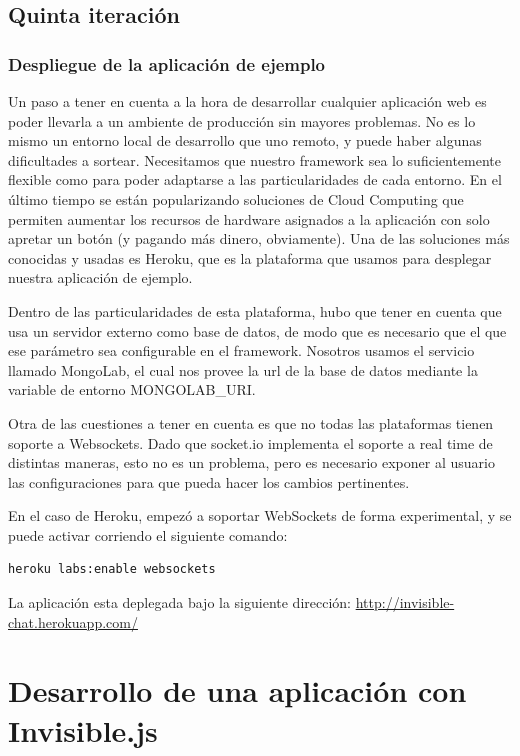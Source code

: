 \documentclass[doc,helv,longtable]{article}
\begin{document}
\subsection{Quinta iteración}
\subsubsection{Despliegue de la aplicación de ejemplo}


Un paso a tener en cuenta a la hora de desarrollar cualquier aplicación web es poder llevarla a un ambiente de producción sin mayores problemas. No es lo mismo un entorno local de desarrollo que uno remoto, y puede haber algunas dificultades a sortear. Necesitamos que nuestro framework sea lo suficientemente flexible como para poder adaptarse a las particularidades de cada entorno. En el último tiempo se están popularizando soluciones de Cloud Computing que permiten aumentar los recursos de hardware asignados a la aplicación con solo apretar un botón (y pagando más dinero, obviamente). Una de las soluciones más conocidas y usadas es Heroku\cite{heroku}, que es la plataforma que usamos para desplegar nuestra aplicación de ejemplo. 

Dentro de las particularidades de esta plataforma, hubo que tener en cuenta que usa un servidor externo como base de datos, de modo que es necesario que el que ese parámetro sea configurable en el framework. Nosotros usamos el servicio llamado MongoLab\cite{mongolab}, el cual nos provee la url de la base de datos mediante la variable de entorno MONGOLAB\_URI.

Otra de las cuestiones a tener en cuenta es que no todas las plataformas tienen soporte a Websockets. Dado que socket.io implementa el soporte a real time de distintas maneras, esto no es un problema, pero es necesario exponer al usuario las configuraciones para que pueda hacer los cambios pertinentes.

En el caso de Heroku, empezó a soportar WebSockets de forma experimental, y se puede activar corriendo el siguiente comando:

\begin{verbatim}
heroku labs:enable websockets
\end{verbatim}

La aplicación esta deplegada bajo la siguiente dirección: \url{http://invisible-chat.herokuapp.com/}

\section{Desarrollo de una aplicación con Invisible.js}
\end{document}
